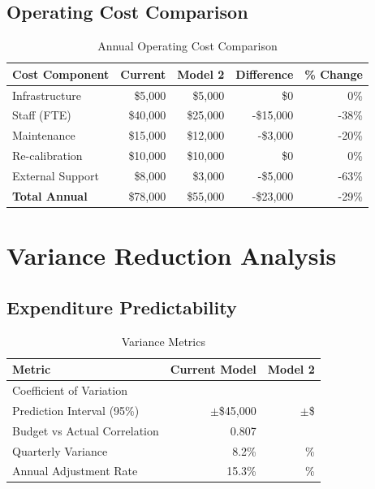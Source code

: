 \subsection{Operating Cost Comparison}

\begin{table}[h]
\centering
\caption{Annual Operating Cost Comparison}
\begin{tabular}{lrrrr}
\toprule
\textbf{Cost Component} & \textbf{Current} & \textbf{Model 2} & \textbf{Difference} & \textbf{\% Change} \\
\midrule
Infrastructure & \$5,000 & \$5,000 & \$0 & 0\% \\
Staff (FTE) & \$40,000 & \$25,000 & -\$15,000 & -38\% \\
Maintenance & \$15,000 & \$12,000 & -\$3,000 & -20\% \\
Re-calibration & \$10,000 & \$10,000 & \$0 & 0\% \\
External Support & \$8,000 & \$3,000 & -\$5,000 & -63\% \\
\midrule
\textbf{Total Annual} & \$78,000 & \$55,000 & -\$23,000 & -29\% \\
\bottomrule
\end{tabular}
\end{table}

\section{Variance Reduction Analysis}

\subsection{Expenditure Predictability}

\begin{table}[h]
\centering
\caption{Variance Metrics}
\begin{tabular}{lrr}
\toprule
\textbf{Metric} & \textbf{Current Model} & \textbf{Model 2} \\
\midrule
Coefficient of Variation & \ModelTwoCVActual{} & \ModelTwoCVPredicted{} \\
Prediction Interval (95\%) & $\pm$\$45,000 & $\pm$\$\ModelTwoPredictionInterval{} \\
Budget vs Actual Correlation & 0.807 & \ModelTwoBudgetActualCorr{} \\
Quarterly Variance & 8.2\% & \ModelTwoQuarterlyVariance{}\% \\
Annual Adjustment Rate & 15.3\% & \ModelTwoAnnualAdjustmentRate{}\% \\
\bottomrule
\end{tabular}
\end{table}

